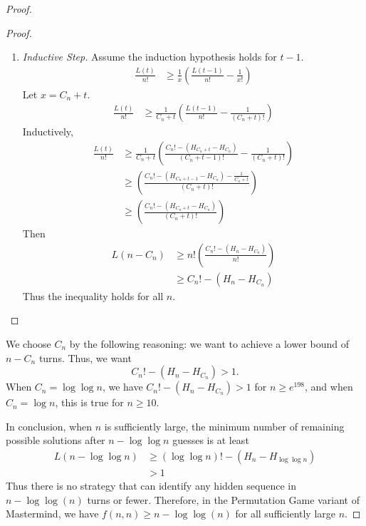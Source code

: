 \documentclass[12pt, a4paper]{article}
\begin{document}
\begin{proof}
\begin{enumerate}[label=]
\begin{proof}
\begin{enumerate}[label=]
		\item \textit{Inductive Step.} Assume the induction hypothesis holds for $t-1$.
			\begin{align*}
			\frac{L(t)}{n!}
			& \ge \frac{1}{x}\left(\frac{L(t-1)}{n!}-\frac{1}{x!}\right)
			\end{align*}
		Let $x=C_{n}+t$.
			\begin{align*}
			\frac{L(t)}{n!}
			& \ge \frac{1}{C_{n}+t}\left(\frac{L(t-1)}{n!}
			-\frac{1}{(C_{n}+t)!}\right)
			\end{align*}
		Inductively,
			\begin{align*}
			\frac{L(t)}{n!}
			& \ge \frac{1}{C_{n}+t}\left(\frac{C_{n}!-(H_{C_{n}+t} - H_{C_{n}})}
			{(C_{n}+t-1)!} - \frac{1}{(C_{n}+t)!}\right)\\
			& \ge \left(\frac{C_{n}! - (H_{C_{n}+t-1} - H_{C_{n}}) - \frac{1}{C_{n}+t}}
			{(C_{n}+t)!}\right)\\
			& \ge \left(\frac{C_{n}! - (H_{C_{n}+t} - H_{C_{n}})}{(C_{n}+t)!}\right)
			\end{align*}
			Then
			\begin{align*}
			L(n-C_{n}) & \ge n!\left(\frac{C_{n}! - (H_n - H_{C_{n}})}{n!}\right)\\
			& \ge C_{n}! - (H_n-H_{C_{n}})
			\end{align*}
		Thus the inequality holds for all $n$.
		\end{enumerate}
		\end{proof}
	\end{enumerate}
	We choose $C_{n}$ by the following reasoning: we want to achieve a lower bound
		of $n-C_{n}$ turns. Thus, we want
		\begin{equation*}
			C_{n}! - (H_n - H_{C_{n}}) > 1.
		\end{equation*}
		When $C_{n}=\log\log n$, we have $C_{n}! - (H_n - H_{C_{n}}) > 1$ for $n\ge e^{198}$, and when $C_{n}=\log n$, this is true for $n\ge 10$.
		
 	In conclusion, when $n$ is sufficiently large, the minimum number of remaining
	possible solutions after $n - \log\log n$ guesses is at least
		\begin{align*}
		L(n-\log\log n)
		& \ge (\log\log n)! - (H_n - H_{\log\log n})\\
		& > 1
		\end{align*}
	Thus there is no strategy that can identify any hidden sequence in $n-\log\log(n)$ turns or fewer. Therefore, in the Permutation Game variant of Mastermind, we have $f(n, n)\ge n - \log\log(n)$ for all sufficiently large $n$.
	\end{proof}
\end{document}
